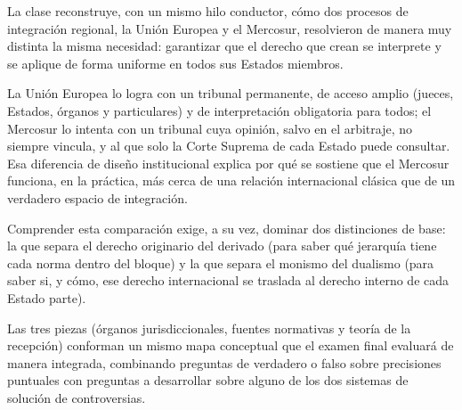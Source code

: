 \documentclass[12pt,oneside]{book}
\begin{document}
La clase reconstruye, con un mismo hilo conductor, cómo dos procesos de integración regional, la Unión Europea y el Mercosur, resolvieron de manera muy distinta la misma necesidad: garantizar que el derecho que crean se interprete y se aplique de forma uniforme en todos sus Estados miembros.

La Unión Europea lo logra con un tribunal permanente, de acceso amplio (jueces, Estados, órganos y particulares) y de interpretación obligatoria para todos; el Mercosur lo intenta con un tribunal cuya opinión, salvo en el arbitraje, no siempre vincula, y al que solo la Corte Suprema de cada Estado puede consultar. Esa diferencia de diseño institucional explica por qué se sostiene que el Mercosur funciona, en la práctica, más cerca de una relación internacional clásica que de un verdadero espacio de integración.

Comprender esta comparación exige, a su vez, dominar dos distinciones de base: la que separa el derecho originario del derivado (para saber qué jerarquía tiene cada norma dentro del bloque) y la que separa el monismo del dualismo (para saber si, y cómo, ese derecho internacional se traslada al derecho interno de cada Estado parte).

Las tres piezas (órganos jurisdiccionales, fuentes normativas y teoría de la recepción) conforman un mismo mapa conceptual que el examen final evaluará de manera integrada, combinando preguntas de verdadero o falso sobre precisiones puntuales con preguntas a desarrollar sobre alguno de los dos sistemas de solución de controversias.
\end{document}
